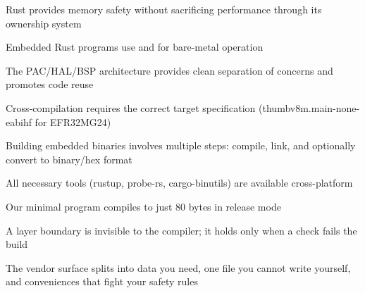 







\clearpage


\begin{keytakeaways}
    \item Rust provides memory safety without sacrificing performance through its ownership system
    \item Embedded Rust programs use  and  for bare-metal operation
    \item The PAC/HAL/BSP architecture provides clean separation of concerns and promotes code reuse
    \item Cross-compilation requires the correct target specification (thumbv8m.main-none-eabihf for EFR32MG24)
    \item Building embedded binaries involves multiple steps: compile, link, and optionally convert to binary/hex format
    \item All necessary tools (rustup, probe-rs, cargo-binutils) are available cross-platform
    \item Our minimal program compiles to just 80 bytes in release mode
    \item A layer boundary is invisible to the compiler; it holds only when a check fails the build
    \item The vendor surface splits into data you need, one file you cannot write yourself, and conveniences that fight your safety rules
\end{keytakeaways}

